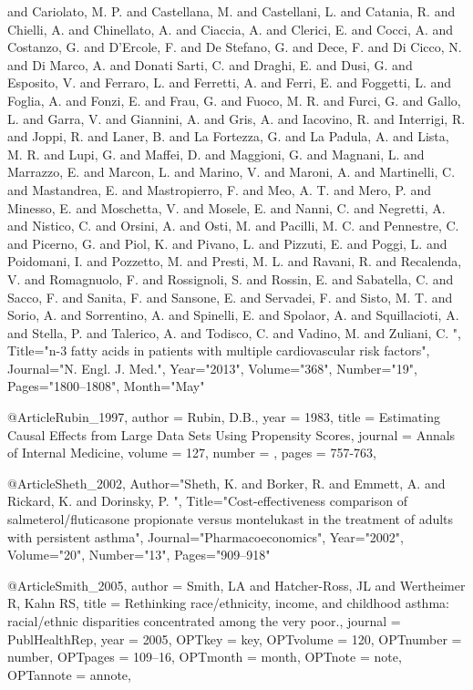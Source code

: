 {{{{and Cariolato, M. P.  and Castellana, M.  and Castellani, L.  and Catania, R.  and Chielli, A.  and Chinellato, A.  and Ciaccia, A.  and Clerici, E.  and Cocci, A.  and Costanzo, G.  and D'Ercole, F.  and De Stefano, G.  and Dece, F.  and Di Cicco, N.  and Di Marco, A.  and Donati Sarti, C.  and Draghi, E.  and Dusi, G.  and Esposito, V.  and Ferraro, L.  and Ferretti, A.  and Ferri, E.  and Foggetti, L.  and Foglia, A.  and Fonzi, E.  and Frau, G.  and Fuoco, M. R.  and Furci, G.  and Gallo, L.  and Garra, V.  and Giannini, A.  and Gris, A.  and Iacovino, R.  and Interrigi, R.  and Joppi, R.  and Laner, B.  and La Fortezza, G.  and La Padula, A.  and Lista, M. R.  and Lupi, G.  and Maffei, D.  and Maggioni, G.  and Magnani, L.  and Marrazzo, E.  and Marcon, L.  and Marino, V.  and Maroni, A.  and Martinelli, C.  and Mastandrea, E.  and Mastropierro, F.  and Meo, A. T.  and Mero, P.  and Minesso, E.  and Moschetta, V.  and Mosele, E.  and Nanni, C.  and Negretti, A.  and Nistico, C.  and Orsini, A.  and Osti, M.  and Pacilli, M. C.  and Pennestre, C.  and Picerno, G.  and Piol, K.  and Pivano, L.  and Pizzuti, E.  and Poggi, L.  and Poidomani, I.  and Pozzetto, M.  and Presti, M. L.  and Ravani, R.  and Recalenda, V.  and Romagnuolo, F.  and Rossignoli, S.  and Rossin, E.  and Sabatella, C.  and Sacco, F.  and Sanita, F.  and Sansone, E.  and Servadei, F.  and Sisto, M. T.  and Sorio, A.  and Sorrentino, A.  and Spinelli, E.  and Spolaor, A.  and Squillacioti, A.  and Stella, P.  and Talerico, A.  and Todisco, C.  and Vadino, M.  and Zuliani, C. ",
   Title="{n-3 fatty acids in patients with multiple cardiovascular risk factors}",
   Journal="N. Engl. J. Med.",
   Year="2013",
   Volume="368",
   Number="19",
   Pages="1800--1808",
   Month="May"
}


@Article{Rubin_1997,
  author = {Rubin, D.B.},
  year = {1983},
  title = {Estimating Causal Effects from Large Data Sets Using Propensity Scores},
  journal = {Annals of Internal Medicine},
  volume =  {127},
  number = {},
  pages = {757-763},
}


@Article{Sheth_2002,
   Author="Sheth, K.  and Borker, R.  and Emmett, A.  and Rickard, K.  and Dorinsky, P. ",
   Title="{{C}ost-effectiveness comparison of salmeterol/fluticasone propionate versus montelukast in the treatment of adults with persistent asthma}",
   Journal="Pharmacoeconomics",
   Year="2002",
   Volume="20",
   Number="13",
   Pages="909--918"
}

@Article{Smith_2005,
author = {Smith, LA and Hatcher-Ross, JL and Wertheimer R, Kahn RS},
title = {Rethinking race/ethnicity, income, and childhood asthma: racial/ethnic disparities concentrated
among the very poor.},
journal = {PublHealthRep},
year = {2005},
OPTkey = {key},
OPTvolume = {120},
OPTnumber = {number},
OPTpages = {109–16},
OPTmonth = {month},
OPTnote = {note},
OPTannote = {annote},
}

}}}
